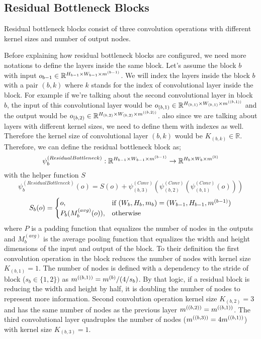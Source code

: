 \subsection{Residual Bottleneck Blocks}
Residual bottleneck blocks consist of three convolution operations with different kernel sizes and number of output nodes. 

Before explaining how residual bottleneck blocks are configured, we need more notations to define the layers inside the same block. Let's assume the block $b$ with input $o_{b-1} \in \mathbb{R}^{H_{b-1} \times W_{b-1} \times m^{(b-1)}}$. We will index the layers inside the block $b$ with a pair $(b, k)$ where $k$ stands for the index of convolutional layer inside the block. For example if we're talking about the second convolutional layer in block $b$, the input of this convolutional layer would be $o_{(b, 1)} \in \mathbb{R}^{H_{(b, 1)} \times W_{(b, 1)} \times m^{((b, 1))}}$ and the output would be $o_{(b, 2)} \in \mathbb{R}^{H_{(b, 2)} \times W_{(b, 2)} \times m^{((b, 2))}}$. also since we are talking about layers with different kernel sizes, we need to define them with indexes as well. Therefore the kernel size of convolutional layer $(b,k)$ would be $K_{(b,k)} \in \mathbb{R}$.
Therefore, we can define the residual bottleneck block as;
$$ \psi_b^{(ResidualBottleneck)}: \mathbb{R}^{H_{b-1} \times W_{b-1} \times m^{(b-1)}} \rightarrow  \mathbb{R}^{H_{b} \times W_{b} \times m^{(b)}} $$
with the helper function $S$
$$ \psi_b^{(ResidualBottleneck)}(o) =  S(o) + \psi_{(b, 3)}^{(Conv)}(\psi_{(b, 2)}^{(Conv)}(\psi_{(b, 1)}^{(Conv)}(o))) $$
\begin{equation*}
    S_b(o) = 
\begin{cases}
    o, &\text{if } (W_b, H_b, m_b) = (W_{b-1}, H_{b-1}, m^{(b-1)})\\
    P_b(M_b^{(avg)}(o)),& \text{otherwise}\\
\end{cases}
\end{equation*}
where $P$ is a padding function that equalizes the number of nodes in the outputs and $M_b^{(avg)}$ is the average pooling function that equalizes the width and height dimensions of the input and output of the block.
To their definition the first convolution operation in the block reduces the number of nodes with kernel size $K_{(b,1)}=1$. The number of nodes is defined with a dependency to the stride of block ($s_b \in \{1,2\})$ as $m^{((b,1))} = m^{(b)}/(4/s_b)$. By that logic, if a residual block is reducing the width and height by half, it is doubling the number of nodes to represent more information. Second convolution operation kernel size $K_{(b,2)}=3$ and has the same number of nodes as the previous layer $m^{((b,2))} = m^{((b,1))}$. The third convolutional layer quadruples the number of nodes ($m^{((b,3))} = 4m^{((b,1))}$) with kernel size $K_{(b,3)} = 1$.

